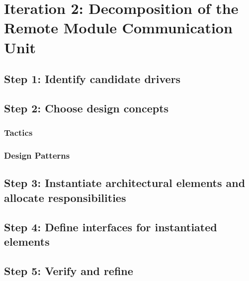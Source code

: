 \section{Iteration 2: Decomposition of the Remote Module Communication Unit}
\label{add:it2}

\subsection{Step 1: Identify candidate drivers}
\label{add:it2/drivers}

\subsection{Step 2: Choose design concepts}
\label{add:it2/concepts}

\subsubsection{Tactics}
\label{add:it2/tactics}

\subsubsection{Design Patterns}
\label{add:it2/patterns}

\subsection{Step 3: Instantiate architectural elements and allocate responsibilities}
\label{add:it2/elements}

\subsection{Step 4: Define interfaces for instantiated elements}
\label{add:it2/interfaces}

\subsection{Step 5: Verify and refine}
\label{add:it2/verification}